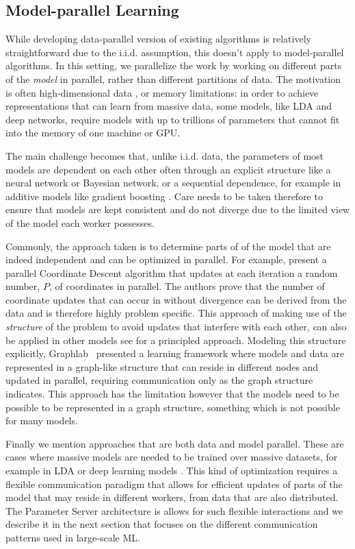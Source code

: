 \subsection*{Model-parallel Learning}

While developing data-parallel version of existing algorithms is relatively straightforward
due to the i.i.d. assumption, this doesn't apply to model-parallel algorithms. In this
setting, we parallelize the work by working on different parts of the \emph{model}
in parallel, rather than different partitions of data. The motivation is often
high-dimensional data \cite{parallel-cd-l1}, or
memory limitations: in order to achieve representations
that can learn from massive data, some models, like LDA and deep networks, require
models with up to trillions of parameters \cite{lightLDA, large-scale-dl}
that cannot fit into the memory of one machine or GPU.

The main challenge becomes
that, unlike i.i.d. data, the parameters of most models are dependent on each
other often through an explicit structure like a neural network or Bayesian network, or a
sequential dependence, for example in additive models like gradient boosting \cite{esl}.
Care needs to be taken therefore to ensure that models are kept consistent and do not
diverge due to the limited view of the model each worker possesses.

Commonly, the approach taken is to determine parts of of the model that are indeed
independent and can be optimized in parallel. For example, \citet{parallel-cd-l1}
present a parallel Coordinate Descent algorithm that updates at each iteration
a random number, $P$, of coordinates in parallel. The authors prove that the number of coordinate updates
that can occur in without divergence can be derived from the data and is therefore
highly problem specific. This approach of making use of the \emph{structure} of
the problem to avoid updates that interfere with each other, can also be applied
in other models see \cite{model-parallel-learning} for a principled approach.
Modeling this structure explicitly, Graphlab~\cite{graphlab, graphlab-distributed} presented a learning framework
where models and data are represented in a graph-like structure that can reside in different
nodes and updated in parallel, requiring communication only as the graph structure
indicates. This approach has the limitation however that the models need to be
possible to be represented in a graph structure, something which is not possible
for many models.

Finally we mention approaches that are both data and model parallel. These are
cases where massive models are needed to be trained over massive datasets, for
example in LDA or deep learning models \cite{large-scale-dl, lightLDA}. This kind of
optimization requires a flexible communication paradigm that allows for efficient
updates of parts of the model that may reside in different workers, from data
that are also distributed. The Parameter Server architecture\cite{muPS} is
allows for such flexible interactions and we describe it in the next
section that focuses on the different communication patterns used
in large-scale ML.

